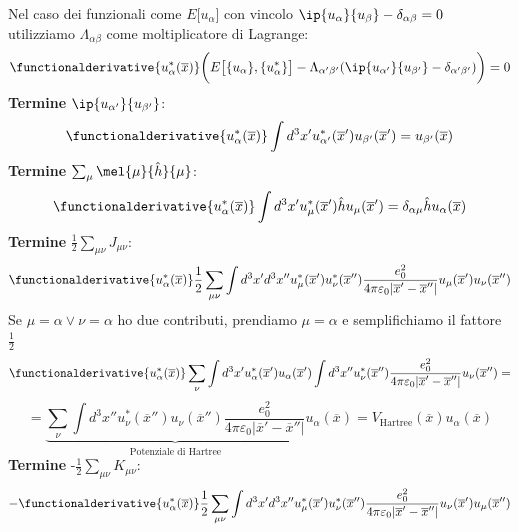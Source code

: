 
Nel caso dei funzionali come $E\big[u_\alpha\big]$ con vincolo $\ip{u_\alpha}{u_\beta}-\delta_{\alpha\beta}=0$ utilizziamo $\Lambda_{\alpha\beta}$ come moltiplicatore di Lagrange:
\begin{equation*}
    \functionalderivative{u_\alpha^*(\overline x)}\bigg(E\big[\{u_\alpha\},\{u^*_\alpha\}\big]-\Lambda_{\alpha'\beta'}(\ip{u_{\alpha'}}{u_{\beta'}}-\delta_{\alpha'\beta'})\bigg)=0
\end{equation*}
\textbf{Termine} $\ip{u_{\alpha'}}{u_{\beta'}}$:
\begin{equation*}
    \functionalderivative{u_\alpha^*(\overline x)}\int d^3x'u_{\alpha'}^*(\overline{x}')u_{\beta'}(\overline{x}')=u_{\beta'}(\overline x)
\end{equation*}
\textbf{Termine} $\sum_{\mu}\mel{\mu}{\hat h}{\mu}$:
\begin{equation*}
    \functionalderivative{u_\alpha^*(\overline x)}\int d^3x'u_\mu^*(\overline{x}')\hat h u_\mu(\overline{x}')=\delta_{\alpha\mu}\hat h u_\alpha(\overline x)
\end{equation*}
\textbf{Termine} $\frac 12\sum_{\mu\nu}J_{\mu\nu}$:
\begin{equation*}
    \functionalderivative{u_\alpha^*(\overline x)}\frac 12 \sum_{\mu\nu}\int d^3x' d^3x''u_\mu^*(\overline{x}')u_\nu^*(\overline{x}'')\frac{e_0^2}{4\pi\varepsilon_0|\overline{x}'-\overline{x}''|}u_\mu({\overline{x}'})u_\nu(\overline{x}'')
\end{equation*}
Se $\mu=\alpha \vee \nu=\alpha$ ho due contributi, prendiamo $\mu=\alpha$ e semplifichiamo il fattore $\frac 12$
\begin{equation*}
    \functionalderivative{u_\alpha^*(\overline x)} \sum_{\nu}\int d^3x' u_\alpha^*(\overline{x}')u_\alpha(\overline{x}') \int d^3x''u_\nu^*(\overline{x}'')\frac{e_0^2}{4\pi\varepsilon_0|\overline{x}'-\overline{x}''|}u_\nu(\overline{x}'') =
\end{equation*}
\begin{equation*}
    = \underbrace{\sum_{\nu}\int d^3x''u_\nu^*(\overline{x}'')u_\nu(\overline{x}'')\frac{e_0^2}{4\pi\varepsilon_0|\overline{x}'-\overline{x}''|}}_{\text{Potenziale di Hartree}}u_\alpha(\overline x)=V_{\text{Hartree}}(\overline x)u_\alpha(\overline x)
\end{equation*}
\textbf{Termine} -$\frac 12\sum_{\mu\nu}K_{\mu\nu}$:
\begin{equation*}
    -\functionalderivative{u_\alpha^*(\overline x)}\frac 12 \sum_{\mu\nu}\int d^3x' d^3x''u_\mu^*(\overline{x}')u_\nu^*(\overline{x}'')\frac{e_0^2}{4\pi\varepsilon_0|\overline{x}'-\overline{x}''|}u_\nu({\overline{x}'})u_\mu(\overline{x}'')
\end{equation*}
